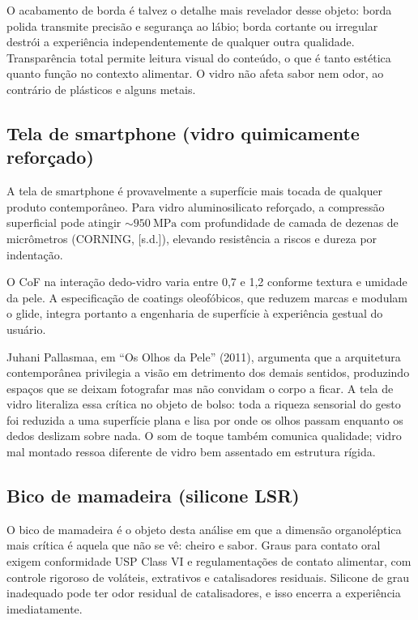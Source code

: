 \documentclass[
  12pt,
  a4paper,
  oneside,
  brazil,
  chapter=TITLE
]{article}
\begin{document}
O acabamento de borda é talvez o detalhe mais revelador desse objeto: borda polida transmite
precisão e segurança ao lábio; borda cortante ou irregular destrói a experiência
independentemente de qualquer outra qualidade. Transparência total permite leitura visual
do conteúdo, o que é tanto estética quanto função no contexto alimentar. O vidro não afeta
sabor nem odor, ao contrário de plásticos e alguns metais.

\subsection{Tela de smartphone (vidro quimicamente reforçado)}

A tela de smartphone é provavelmente a superfície mais tocada de qualquer produto
contemporâneo. Para vidro aluminosilicato reforçado, a compressão superficial pode atingir
${\sim}950\ \mathrm{MPa}$ com profundidade de camada de dezenas de micrômetros
(CORNING, [s.d.]), elevando resistência a riscos e dureza por indentação.

O CoF na interação dedo-vidro varia entre 0,7 e 1,2 conforme textura e umidade da pele.
A especificação de coatings oleofóbicos, que reduzem marcas e modulam o glide, integra
portanto a engenharia de superfície à experiência gestual do usuário.

Juhani Pallasmaa, em ``Os Olhos da Pele'' (2011), argumenta que a arquitetura contemporânea
privilegia a visão em detrimento dos demais sentidos, produzindo espaços que se deixam
fotografar mas não convidam o corpo a ficar. A tela de vidro literaliza essa crítica no
objeto de bolso: toda a riqueza sensorial do gesto foi reduzida a uma superfície plana e
lisa por onde os olhos passam enquanto os dedos deslizam sobre nada. O som de toque também
comunica qualidade; vidro mal montado ressoa diferente de vidro bem assentado em estrutura
rígida.

\subsection{Bico de mamadeira (silicone LSR)}

O bico de mamadeira é o objeto desta análise em que a dimensão organoléptica mais crítica
é aquela que não se vê: cheiro e sabor. Graus para contato oral exigem conformidade
USP Class VI e regulamentações de contato alimentar, com controle rigoroso de voláteis,
extrativos e catalisadores residuais. Silicone de grau inadequado pode ter odor residual
de catalisadores, e isso encerra a experiência imediatamente.
\end{document}
